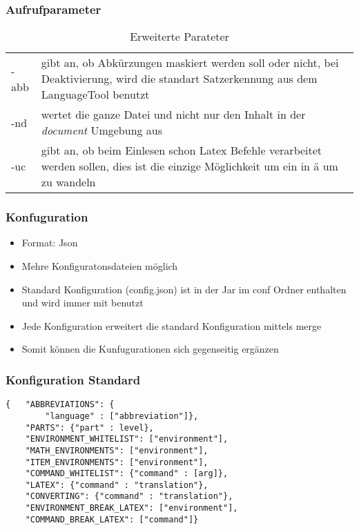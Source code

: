 \begin{frame}
\frametitle{Aufrufparameter}
\begin{block}{\vspace*{-3ex}}
\begin{table}[h]
\caption{Erweiterte Parateter}
	\begin{tabular}{l|p{9cm}}
		-abb & gibt an, ob Abkürzungen maskiert werden soll oder nicht, bei Deaktivierung, wird die standart Satzerkennung aus dem LanguageTool benutzt\\
		-nd & wertet die ganze Datei und nicht nur den Inhalt in der \emph{document} Umgebung aus\\
		-uc & gibt an, ob beim Einlesen schon Latex Befehle verarbeitet werden sollen, dies ist die einzige Möglichkeit um ein \command{"a} in ä um zu wandeln
	\end{tabular}
\end{table}
\end{block}
\end{frame}

\begin{frame}
\frametitle{Konfuguration}
\begin{block}{\vspace*{-3ex}}
\begin{itemize}
\item Format: Json
\item Mehre Konfiguratonsdateien möglich
\item Standard Konfiguration (config.json) ist in der Jar im conf Ordner enthalten und wird immer mit benutzt
\item Jede Konfiguration erweitert die standard Konfiguration mittels merge
\item Somit können die Kunfugurationen sich gegenseitig ergänzen 
\end{itemize}
\end{block}
\end{frame}

\begin{frame}[fragile]
\frametitle{Konfiguration Standard}
\begin{block}{\vspace*{-3ex}}
\begin{lstlisting}
{	"ABBREVIATIONS": {
        "language" : ["abbreviation"]},
    "PARTS": {"part" : level},
    "ENVIRONMENT_WHITELIST": ["environment"],
    "MATH_ENVIRONMENTS": ["environment"],
    "ITEM_ENVIRONMENTS": ["environment"],
    "COMMAND_WHITELIST": {"command" : [arg]},
    "LATEX": {"command" : "translation"},
    "CONVERTING": {"command" : "translation"},
    "ENVIRONMENT_BREAK_LATEX": ["environment"],
    "COMMAND_BREAK_LATEX": ["command"]}
\end{lstlisting}
\end{block}
\end{frame}

